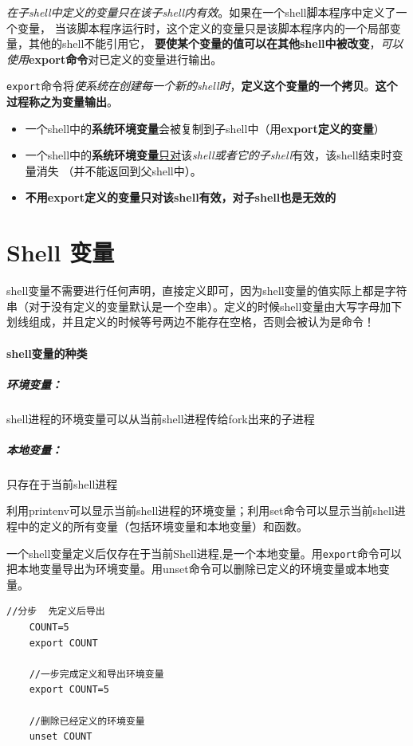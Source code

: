 \documentclass[UTF8,a4paper,12pt]{ctexbook}
\begin{document}
					\textit{在子shell中定义的变量只在该子shell内有效}。如果在一个shell脚本程序中定义了一个变量，
					当该脚本程序运行时，这个定义的变量只是该脚本程序内的一个局部变量，其他的shell不能引用它，
					\textbf{要使某个变量的值可以在其他shell中被改变}，\textit{可以使用}\textbf{export命令}对已定义的变量进行输出。
					
					
					\verb|export|命令将\textit{使系统在创建每一个新的shell时}，\textbf{定义这个变量的一个拷贝}。\textbf{这个过程称之为变量输出}。
					
					\begin{itemize}
						\item 一个shell中的\textbf{系统环境变量}会被复制到子shell中（用\textbf{export定义的变量}）
						\item 一个shell中的\textbf{系统环境变量}\underline{只对}该\textit{shell或者它的子shell}有效，该shell结束时变量消失
						（并不能返回到父shell中）。
						\item \textbf{不用export定义的变量只对该shell有效，对子shell也是无效的}
					\end{itemize}
		 \section{Shell 变量}
			 shell变量不需要进行任何声明，直接定义即可，因为shell变量的值实际上都是字符串（对于没有定义的变量默认是一个空串）。定义的时候shell变量由大写字母加下划线组成，并且定义的时候等号两边不能存在空格，否则会被认为是命令！
			 
			 \paragraph{shell变量的种类}
				 \subparagraph{环境变量：}shell进程的环境变量可以从当前shell进程传给fork出来的子进程
				 \subparagraph{本地变量：}只存在于当前shell进程
				 
				 利用printenv可以显示当前shell进程的环境变量；利用set命令可以显示当前shell进程中的定义的所有变量（包括环境变量和本地变量）和函数。
				 
				 一个shell变量定义后仅存在于当前Shell进程,是一个本地变量。用\verb|export|命令可以把本地变量导出为环境变量。用unset命令可以删除已定义的环境变量或本地变量。
					 \begin{lstlisting}[frame=L,xleftmargin=.06\textwidth]
	//分步  先定义后导出
	COUNT=5
	export COUNT
	
	//一步完成定义和导出环境变量
	export COUNT=5 
	
	//删除已经定义的环境变量
	unset COUNT
					 \end{lstlisting}
				
\end{document}
